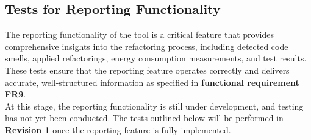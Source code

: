 \documentclass[12pt, titlepage]{article}
\begin{document}
\subsection{Tests for Reporting Functionality}
The reporting functionality of the tool is a critical feature that
provides comprehensive insights into the refactoring process,
including detected code smells, applied refactorings, energy
consumption measurements, and test results. These tests ensure that
the reporting feature operates correctly and delivers accurate,
well-structured information as specified in \textbf{functional
requirement FR9}.\\

\noindent At this stage, the reporting functionality is still under
development, and testing has not yet been conducted. The tests
outlined below will be performed in \textbf{Revision 1} once the
reporting feature is fully implemented.
\end{document}
